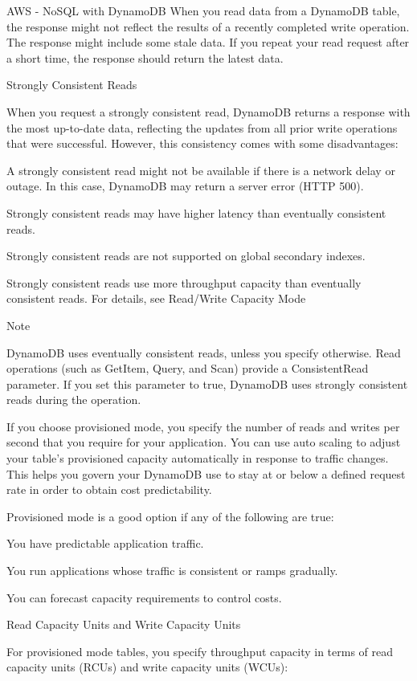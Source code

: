 \begin{frame}{AWS - NoSQL with DynamoDB}
When you read data from a DynamoDB table, the response might not reflect the results of a recently completed write operation. The response might include some stale data. If you repeat your read request after a short time, the response should return the latest data.

Strongly Consistent Reads

When you request a strongly consistent read, DynamoDB returns a response with the most up-to-date data, reflecting the updates from all prior write operations that were successful. However, this consistency comes with some disadvantages:

    A strongly consistent read might not be available if there is a network delay or outage. In this case, DynamoDB may return a server error (HTTP 500).

    Strongly consistent reads may have higher latency than eventually consistent reads.

    Strongly consistent reads are not supported on global secondary indexes.

    Strongly consistent reads use more throughput capacity than eventually consistent reads. For details, see Read/Write Capacity Mode

Note

DynamoDB uses eventually consistent reads, unless you specify otherwise. Read operations (such as GetItem, Query, and Scan) provide a ConsistentRead parameter. If you set this parameter to true, DynamoDB uses strongly consistent reads during the operation.


If you choose provisioned mode, you specify the number of reads and writes per second that you require for your application. You can use auto scaling to adjust your table’s provisioned capacity automatically in response to traffic changes. This helps you govern your DynamoDB use to stay at or below a defined request rate in order to obtain cost predictability.

Provisioned mode is a good option if any of the following are true:

    You have predictable application traffic.

    You run applications whose traffic is consistent or ramps gradually.

    You can forecast capacity requirements to control costs.



Read Capacity Units and Write Capacity Units

For provisioned mode tables, you specify throughput capacity in terms of read capacity units (RCUs) and write capacity units (WCUs):


\end{frame}
